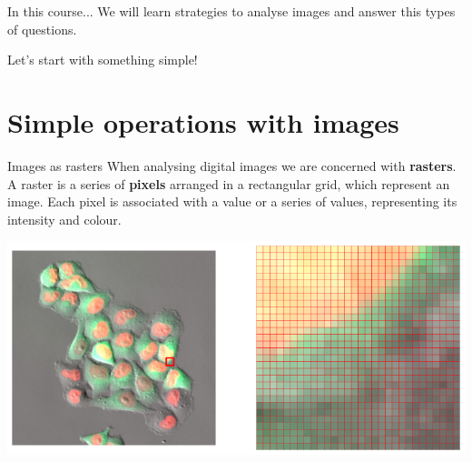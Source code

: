 \documentclass[9pt, aspectratio=169]{beamer}
\begin{document}
\begin{frame}
    {In this course...}
    \centering
    \Large
    We will learn strategies to analyse images and answer this types of questions.
    
    Let's start with something simple!
    
\end{frame}

\section{Simple operations with images}

\begin{frame}
{Images as rasters}
When analysing digital images we are concerned with \textbf{rasters}.\\
A raster is a series of \textbf{pixels} arranged in a rectangular grid, which represent an image. Each pixel is associated with a value or a series of values, representing its intensity and colour.
\begin{center}
    \includegraphics[width=.8\textwidth]{raster.png}
\end{center}
\end {frame}
\end{document}
